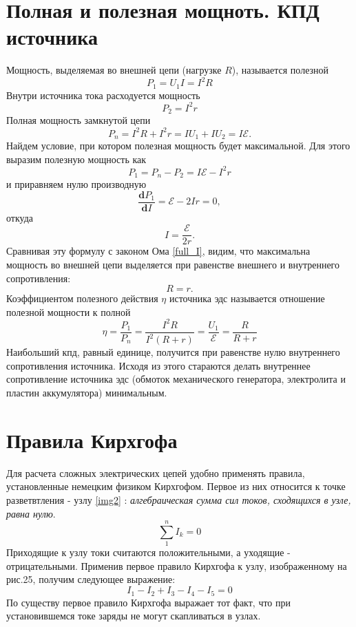\documentclass[a4paper,10pt]{book}
\begin{document}
\section{Полная и полезная мощноть. КПД источника}
Мощность, выделяемая во внешней цепи (нагрузке $R$), называется полезной
\begin{equation}
 P_1 = U_1I = I^2R\nonumber
\end{equation}
Внутри источника тока расходуется мощность 
\begin{equation}
 P_2 = I^2r\nonumber
\end{equation}
Полная мощность замкнутой цепи
\begin{equation}\label{full_P}
 P_n = I^2R + I^2r = IU_1 + IU_2 = I\mathcal{E}.
\end{equation}
Найдем условие, при котором полезная мощность будет максимальной. Для этого выразим полезную мощность как 
\begin{equation}
 P_1 = P_n - P_2 = I\mathcal{E} - I^2r\nonumber
\end{equation}
и приравняем нулю производную
\begin{equation}
 \frac{\mathbf{d}P_1}{\mathbf{d}I} = \mathcal{E} - 2Ir = 0,\nonumber
\end{equation}
откуда
\begin{equation}\label{profit_I}
 I = \frac{\mathcal{E}}{2r}.
\end{equation}
Сравнивая эту формулу с законом Ома \ref{full_I}, видим, что максимальна мощность во внешней цепи выделяется при равенстве внешнего и 
внутреннего сопротивления:
\begin{equation}\label{exeqin}
 R = r.
\end{equation}
Коэффициентом полезного действия $\eta$ источника эдс называется отношение полезной мощности к полной
\begin{equation}\label{nu}
 \eta = \frac{P_1}{P_n} = \frac{I^2R}{I^2(R + r)} = \frac{U_1}{\mathcal{E}} = \frac{R}{R + r}
\end{equation}
Наибольший кпд, равный единице, получится при равенстве нулю внутреннего сопротивления источника. Исходя из этого стараются делать внутреннее
сопротивление источника эдс (обмоток механического генератора, электролита и пластин аккумулятора) минимальным.
\section{Правила Кирхгофа}
Для расчета сложных электрических цепей удобно применять правила, установленные немецким физиком Кирхгофом. Первое из них относится к точке
разветвтления - узлу \ref{img2} : \emph{алгебраическая сумма сил токов, сходящихся в узле, равна нулю}.
\begin{equation}\label{kirchgoff1}
 \sum_1^n I_k = 0
\end{equation}
Приходящие к узлу токи считаются положительными, а уходящие - отрицательными. Применив первое правило Кирхгофа к узлу, изображенному на рис.25,
получим следующее выражение:
\begin{equation}
 I_1 - I_2 + I_3 - I_4 - I_5 = 0\nonumber
\end{equation}
По существу первое правило Кирхгофа выражает тот факт, что при установившемся токе заряды не могут скапливаться в узлах.
\end{document}
